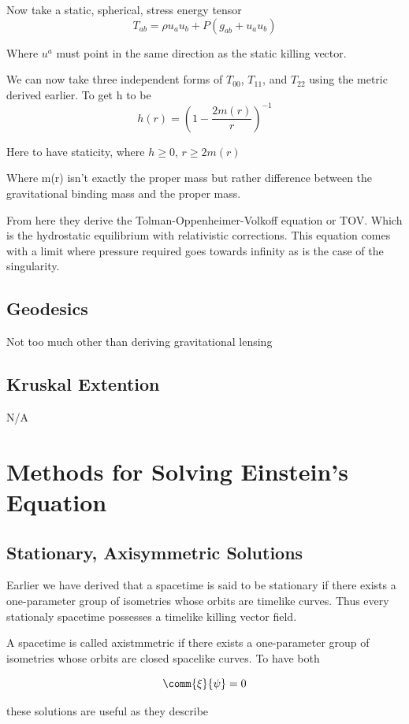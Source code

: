 Now take a static, spherical, stress energy tensor
\[
T_{ab}= \rho u_a u_b + P(g_{ab}+u_au_b)
  \]

  Where $u^a$ must point in the same direction as the static killing vector.

  We can now take three independent forms of $T_{00}$, $T_{11}$, and $T_{22}$ using the metric derived earlier. To get h to be
\[
h(r)= \left(1- \frac{2m(r)}{r}   \right)^{-1}
  \]

  Here to have staticity, where $h \geq 0$, $r \geq 2m(r)$

Where m(r) isn't exactly the proper mass but rather difference between the gravitational binding mass and the proper mass.


From here they derive the Tolman-Oppenheimer-Volkoff equation or TOV. Which is the hydrostatic equilibrium with relativistic corrections. This equation comes with a limit where pressure required goes towards infinity as is the case of the singularity.

\subsection{Geodesics}


Not too much other than deriving gravitational lensing

\subsection{Kruskal Extention}

N/A


\section{Methods for Solving Einstein's Equation}

\subsection{Stationary, Axisymmetric Solutions}

Earlier we have derived that a spacetime is said to be stationary if there exists a one-parameter group of isometries whose orbits are timelike curves. Thus every stationaly spacetime possesses a timelike killing vector field.

A spacetime is called axistmmetric if there exists a one-parameter group of isometries whose orbits are closed spacelike curves. To have both

\[
\comm{\xi}{\psi} = 0
  \]

  these solutions are useful as they describe
